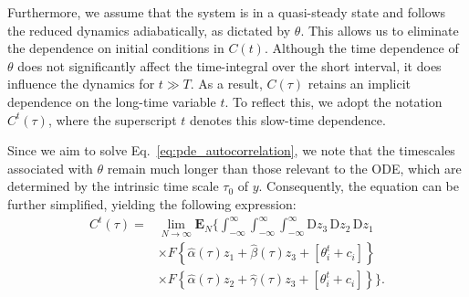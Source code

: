 \documentclass[reprint,amsmath,amssymb,aps]{revtex4-2}
\begin{document}
Furthermore, we assume that the system is in a quasi-steady state and follows the reduced dynamics adiabatically, as dictated by \(\theta\). This allows us to eliminate the dependence on initial conditions in \(C(t)\). Although the time dependence of \(\theta\) does not significantly affect the time-integral over the short interval, it does influence the dynamics for \(t \gg T\). As a result, \(C(\tau)\) retains an implicit dependence on the long-time variable \(t\). To reflect this, we adopt the notation \(C^t(\tau)\), where the superscript \(t\) denotes this slow-time dependence.%


Since we aim to solve Eq.~\eqref{eq:pde_autocorrelation}, we note that the timescales associated with \(\theta\) remain much longer than those relevant to the ODE, which are determined by the intrinsic time scale \(\tau_0\) of \(y\). Consequently, the equation can be further simplified, yielding the following expression: 
\begin{align*}
  C^t(\tau) = &\lim_{N\to\infty} \mathbf{E}_{N} \Bigg\{\int_{-\infty}^\infty \int_{-\infty}^\infty \int_{-\infty}^\infty \mathrm{D}z_3 \, \mathrm{D}z_2 \, \mathrm{D}z_1 \,
  \\
  &\times
  F\left\{\hat{\alpha}(\tau) z_1 + \hat{\beta}(\tau) z_3 + \left[\theta_i^t + c_i\right]
  \right\} \\
  &\times
  F\left\{\hat{\alpha}(\tau) z_2 + \hat{\gamma}(\tau) z_3 + \left[\theta_i^{t} + c_i\right]\right\}\Bigg\}.
\end{align*}
\end{document}

